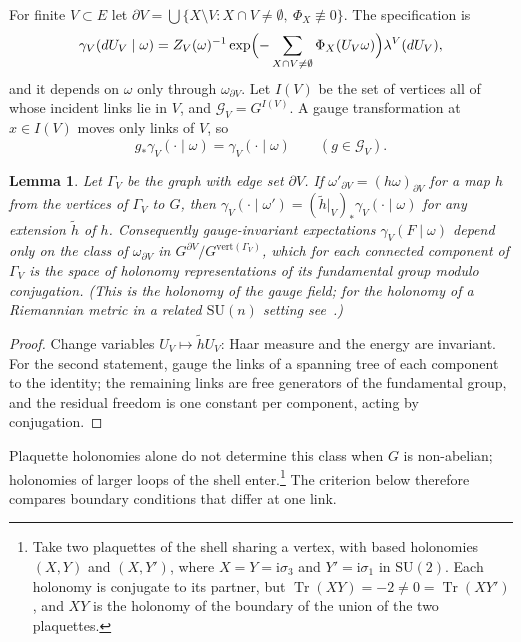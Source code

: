 \documentclass[11pt]{amsart}
\newtheorem{lemma}[theorem]{Lemma}
\theoremstyle{definition}
\theoremstyle{remark}
\newcommand{\SU}{\mathrm{SU}}
\newcommand{\Tr}{\operatorname{Tr}}
\begin{document}
For finite $V\subset E$ let $\partial V=\bigcup\{X\setminus V:X\cap V\ne
\emptyset,\ \Phi_X\not\equiv0\}$. The specification is
\[
\gamma_V(dU_V\mid\omega)=Z_V(\omega)^{-1}\exp\Bigl(-\sum_{X\cap V\ne\emptyset}
\Phi_X(U_V\omega)\Bigr)\lambda^V(dU_V),
\]
and it depends on $\omega$ only through $\omega_{\partial V}$. Let $I(V)$ be the
set of vertices all of whose incident links lie in $V$, and $\mathcal G_V=
G^{I(V)}$. A gauge transformation at $x\in I(V)$ moves only links of $V$, so
\begin{equation}\label{eq:interiorinv}
g_*\gamma_V(\cdot\mid\omega)=\gamma_V(\cdot\mid\omega)\qquad(g\in\mathcal G_V).
\end{equation}

\begin{lemma}\label{lem:quotient}
Let $\Gamma_V$ be the graph with edge set $\partial V$. If
$\omega'_{\partial V}=(h\omega)_{\partial V}$ for a map $h$ from the vertices of
$\Gamma_V$ to $G$, then $\gamma_V(\cdot\mid\omega')=(\tilde h|_V)_*\gamma_V(
\cdot\mid\omega)$ for any extension $\tilde h$ of $h$. Consequently
gauge-invariant expectations $\gamma_V(F\mid\omega)$ depend only on the class of
$\omega_{\partial V}$ in $G^{\partial V}/G^{\mathrm{vert}(\Gamma_V)}$, which for
each connected component of $\Gamma_V$ is the space of holonomy representations
of its fundamental group modulo conjugation. (This is the holonomy of the
gauge field; for the holonomy of a Riemannian metric in a related $\SU(n)$
setting see~\cite{BTBS26}.)
\end{lemma}

\begin{proof}
Change variables $U_V\mapsto\tilde hU_V$: Haar measure and the energy are
invariant. For the second statement, gauge the links of a spanning tree of each
component to the identity; the remaining links are free generators of the
fundamental group, and the residual freedom is one constant per component,
acting by conjugation.
\end{proof}

Plaquette holonomies alone do not determine this class when $G$ is
non-abelian; holonomies of larger loops of the shell
enter.\footnote{Take two plaquettes of the shell sharing a vertex, with based
holonomies $(X,Y)$ and $(X,Y')$, where $X=Y=\mathrm i\sigma_3$ and
$Y'=\mathrm i\sigma_1$ in $\SU(2)$. Each holonomy is conjugate to its partner,
but $\Tr(XY)=-2\ne0=\Tr(XY')$, and $XY$ is the holonomy of the boundary of the
union of the two plaquettes.} The criterion below therefore compares boundary
conditions that differ at one link.
\end{document}
